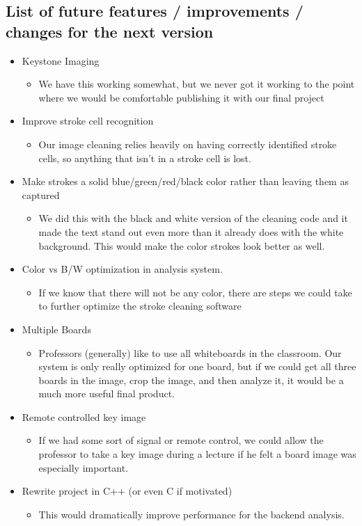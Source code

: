 \documentclass[]{article}
\begin{document}
		
		\subsection{List of future features / improvements / changes for the next version}
		
			\begin{itemize}
				\item Keystone Imaging
					\begin{itemize}
						\item We have this working somewhat, but we never got it working to the point where we would be comfortable publishing it with our final project
					\end{itemize}
				\item Improve stroke cell recognition
					\begin{itemize}
						\item Our image cleaning relies heavily on having correctly identified stroke cells, so anything that isn’t in a stroke cell is lost.
					\end{itemize}
				\item Make strokes a solid blue/green/red/black color rather than leaving them as captured
					\begin{itemize}
						\item We did this with the black and white version of the cleaning code and it made the text stand out even more than it already does with the white background. This would make the color strokes look better as well.
					\end{itemize}
				\item Color vs B/W optimization in analysis system.
					\begin{itemize}
						\item If we know that there will not be any color, there are steps we could take to further optimize the stroke cleaning software
					\end{itemize}
				\item Multiple Boards
					\begin{itemize}
						\item Professors (generally) like to use all whiteboards in the classroom. Our system is only really optimized for one board, but if we could get all three boards in the image, crop the image, and then analyze it, it would be a much more useful final product.
					\end{itemize}
				\item Remote controlled key image
					\begin{itemize}
						\item If we had some sort of signal or remote control, we could allow the professor to take a key image during a lecture if he felt a board image was especially important.
					\end{itemize}
				\item Rewrite project in C++ (or even C if motivated)
					\begin{itemize}
						\item This would dramatically improve performance for the backend analysis.
					\end{itemize}
			\end{itemize}
		
	
	\newpage
	
	
\end{document}
